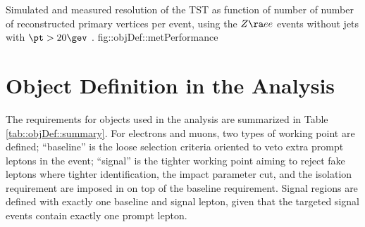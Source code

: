 {
Simulated and measured resolution of the TST as function of number of number of reconstructed primary vertices per event, using the $Z\ra ee$ events without jets with $\pt>20\gev$ \cite{177_MET_data2016}.
}
{fig::objDef::metPerformance}




\clearpage
\section{Object Definition in the Analysis} \label{sec::objDef::objDef}
The requirements for objects used in the analysis are summarized in Table \ref{tab::objDef::summary}.
For electrons and muons, two types of working point are defined;
``baseline'' is the loose selection criteria oriented to veto extra prompt leptons in the event; 
``signal'' is the tighter working point aiming to reject fake leptons where tighter identification, the impact parameter cut, and the isolation requirement are imposed in on top of the baseline requirement.
Signal regions are defined with exactly one baseline and signal lepton, given that the targeted signal events contain exactly one prompt lepton. 


